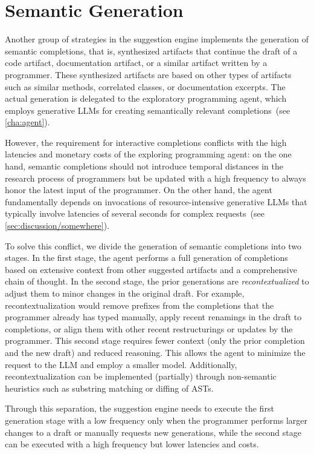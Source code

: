 
\section{Semantic Generation}
\label{sec:suggestions/generation}

Another group of strategies in the suggestion engine implements the generation of semantic completions, that is, synthesized artifacts that continue the draft of a code artifact, documentation artifact, or a similar artifact written by a programmer.
These synthesized artifacts are based on other types of artifacts such as similar methods, correlated classes, or documentation excerpts.
The actual generation is delegated to the exploratory programming agent, which employs generative LLMs for creating semantically relevant completions~(see \cref{cha:agent}).

However, the requirement for interactive completions conflicts with the high latencies and monetary costs of the exploring programming agent:
on the one hand, semantic completions should not introduce temporal distances in the research process of programmers but be updated with a high frequency to always honor the latest input of the programmer.
On the other hand, the agent fundamentally depends on invocations of resource-intensive generative LLMs that typically involve latencies of several seconds for complex requests~(see \cref{sec:discussion/somewhere}).

To solve this conflict, we divide the generation of semantic completions into two stages.
In the first stage, the agent performs a full generation of completions based on extensive context from other suggested artifacts and a comprehensive chain of thought.
In the second stage, the prior generations are \emph{recontextualized} to adjust them to minor changes in the original draft.
For example, recontextualization would remove prefixes from the completions that the programmer already has typed manually, apply recent renamings in the draft to completions, or align them with other recent restructurings or updates by the programmer.
This second stage requires fewer context (only the prior completion and the new draft) and reduced reasoning.
This allows the agent to minimize the request to the LLM and employ a smaller model.
Additionally, recontextualization can be implemented (partially) through non-semantic heuristics such as substring matching or diffing of ASTs.

Through this separation, the suggestion engine needs to execute the first generation stage with a low frequency only when the programmer performs larger changes to a draft or manually requests new generations, while the second stage can be executed with a high frequency but lower latencies and costs.

